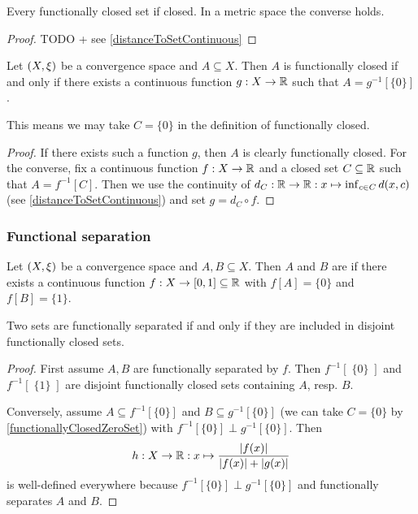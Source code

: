 \begin{proposition}
Every functionally closed set if closed. In a metric space the converse holds.
\end{proposition}
\begin{proof}
TODO + see \ref{distanceToSetContinuous}
\end{proof}

\begin{lemma} \label{functionallyClosedZeroSet}
Let $\sSet{X,\xi}$ be a convergence space and $A\subseteq X$. Then $A$ is functionally closed \textup{if and only if} there exists a continuous function $g: X\to \mathbb{R}$ such that $A = g^{-1}[\{0\}]$.
\end{lemma}
This means we may take $C = \{0\}$ in the definition of functionally closed.
\begin{proof}
If there exists such a function $g$, then $A$ is clearly functionally closed. For the converse, fix a continuous function $f: X\to \mathbb{R}$ and a closed set $C\subseteq \mathbb{R}$ such that $A = f^{-1}[C]$. Then we use the continuity of $d_C: \mathbb{R}\to\mathbb{R}: x\mapsto \inf_{c\in C}d(x,c)$ (see \ref{distanceToSetContinuous}) and set $g = d_C\circ f$.
\end{proof}

\subsubsection{Functional separation}
\begin{definition}
Let $\sSet{X,\xi}$ be a convergence space and $A,B\subseteq X$. Then $A$ and $B$ are  if there exists a continuous function $f: X\to [0,1]\subseteq \mathbb{R}$ with $f[A] = \{0\}$ and $f[B] = \{1\}$.
\end{definition}

\begin{proposition}
Two sets are functionally separated \textup{if and only if} they are included in disjoint functionally closed sets.
\end{proposition}
\begin{proof}
First assume $A,B$ are functionally separated by $f$. Then $f^{-1}[\;\{0\}\;]$ and $f^{-1}[\;\{1\}\;]$ are disjoint functionally closed sets containing $A$, resp. $B$.

Conversely, assume $A\subseteq f^{-1}[\{0\}]$ and $B\subseteq g^{-1}[\{0\}]$ (we can take $C = \{0\}$ by \ref{functionallyClosedZeroSet}) with $f^{-1}[\{0\}]\perp g^{-1}[\{0\}]$. Then
\[ h: X\to \mathbb{R}: x\mapsto \frac{|f(x)|}{|f(x)|+|g(x)|} \]
is well-defined everywhere because $f^{-1}[\{0\}]\perp g^{-1}[\{0\}]$ and functionally separates $A$ and $B$.
\end{proof}

